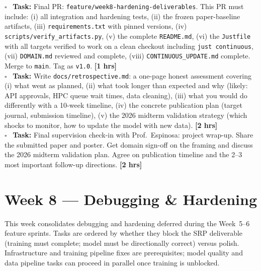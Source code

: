 \documentclass[11pt]{article}
\newcommand{\hrs}[1]{\textbf{[#1 hrs]}}
\newcommand{\task}[2]{%
  \noindent\textbf{Task:} #1 \hfill \hrs{#2}\\}
\newcommand{\done}{\textcolor{sectionblue}{$\square$}\ }
\begin{document}
\begin{taskbox}
\done \task{Final PR: \texttt{feature/week8-hardening-deliverables}. This PR
  must include: (i) all integration and hardening tests, (ii) the frozen
  paper-baseline artifacts, (iii) \texttt{requirements.txt} with pinned
  versions, (iv) \texttt{scripts/verify\_artifacts.py}, (v) the complete
  \texttt{README.md}, (vi) the \texttt{Justfile} with all targets verified
  to work on a clean checkout including \texttt{just continuous},
  (vii) \texttt{DOMAIN.md} reviewed and complete,
  (viii) \texttt{CONTINUOUS\_UPDATE.md} complete.
  Merge to \texttt{main}. Tag as \texttt{v1.0}.}{1}

\done \task{Write \texttt{docs/retrospective.md}: a one-page honest assessment
  covering (i) what went as planned, (ii) what took longer than expected
  and why (likely: API approvals, HPC queue wait times, data cleaning),
  (iii) what you would do differently with a 10-week timeline, (iv) the
  concrete publication plan (target journal, submission timeline), (v) the
  2026 midterm validation strategy (which shocks to monitor, how to
  update the model with new data).}{2}

\done \task{Final supervision check-in with Prof.\ Espinosa: project wrap-up.
  Share the submitted paper and poster. Get domain sign-off on the framing
  and discuss the 2026 midterm validation plan. Agree on publication
  timeline and the 2--3 most important follow-up directions.}{2}
\end{taskbox}

\newpage
\section{Week 8 --- Debugging \& Hardening}

This week consolidates debugging and hardening deferred during the Week~5--6
feature sprints. Tasks are ordered by whether they block the SRP deliverable
(training must complete; model must be directionally correct) versus polish.
Infrastructure and training pipeline fixes are prerequisites; model quality
and data pipeline tasks can proceed in parallel once training is unblocked.
\end{document}
